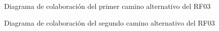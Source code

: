 \begin{itemize}
\begin{figure} [!htb]
		\caption{Diagrama de colaboración del primer camino alternativo del RF03}
		\label{fig:diagramaColaboracion_RF03_2}
	\end{figure}
	\begin{figure} [!htb]
		\centering
		\caption{Diagrama de colaboración del segundo camino alternativo del RF03}
		\label{fig:diagramaColaboracion_RF03_3}
	\end{figure}
	

\end{itemize}
